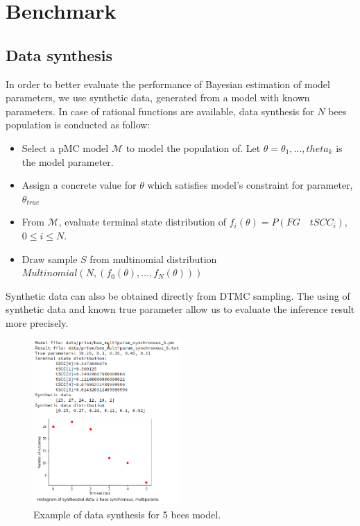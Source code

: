 \documentclass[12pt]{article}
\theoremstyle{definition}
\begin{document}
\section{Benchmark}
\subsection{Data synthesis}
In order to better evaluate the performance of Bayesian estimation of model
parameters, we use synthetic data, generated from a model with known parameters.
In case of rational functions are available, data synthesis for $N$ bees
population is conducted as follow:
\begin{itemize}
\item Select a pMC model $\mathcal{M}$ to model the population of. Let
  $\theta=\theta_1,\ldots,theta_k$ is the model parameter.
\item Assign a concrete value for $\theta$ which satisfies model's constraint
  for parameter, $\theta_{true}$
\item From $\mathcal{M}$, evaluate terminal state distribution of $f_i(\theta) =
  P(FG\quad tSCC_i)$, $0 \leq i \leq N$.
\item Draw sample $S$ from multinomial distribution $Multinomial(N,
  (f_0(\theta),\ldots,f_N(\theta)))$
\end{itemize}
Synthetic data can also be obtained directly from DTMC sampling. The using of
synthetic data and known true parameter allow us to evaluate the inference
result more precisely.
\begin{figure}[H]
  \centering
  \includegraphics[width=0.5\textwidth,keepaspectratio]{figures/data_synthesis.png}
  \caption{Example of data synthesis for 5 bees model.}
\end{figure}
\end{document}
